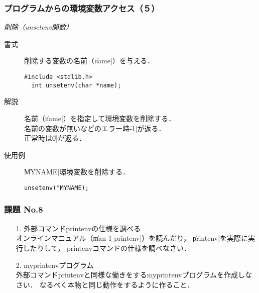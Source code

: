 \documentclass{beamer}                 %
\begin{document}
\begin{frame}[fragile]
  \frametitle{プログラムからの環境変数アクセス（５）}
  \emph{削除（unsetenv関数）}
  \begin{description}
  \item [書式] 削除する変数の名前（\|name|）を与える．
\begin{lstlisting}[numbers=none]
  #include <stdlib.h>
  int unsetenv(char *name);
\end{lstlisting}
  \item [解説] 名前（\|name|）を指定して環境変数を削除する．\\
    名前の変数が無いなどのエラー時\|-1|が返る．\\
    正常時は\|0|が返る．
  \item [使用例] \|MYNAME|環境変数を削除する．
\begin{lstlisting}[numbers=none]
  unsetenv("MYNAME);
\end{lstlisting}
  \end{description}
  \vfill
\end{frame}

\begin{frame}[fragile]
  \frametitle{課題 No.8}
  \begin{enumerate}
  \item[1.] 外部コマンドprintenvの仕様を調べる \\
    オンラインマニュアル（\|man 1 printenv|）を読んだり，
    \|printenv|を実際に実行したりして，
    printenvコマンドの仕様を調べなさい．
    \vfill
  \item[2.] myprintenvプログラム\\
    外部コマンドprintenvと同様な働きをするmyprintenvプログラムを作成しなさい．
    なるべく本物と同じ動作をするように作ること．
  \end{enumerate}
  \vfill
\end{frame}

\end{document}
